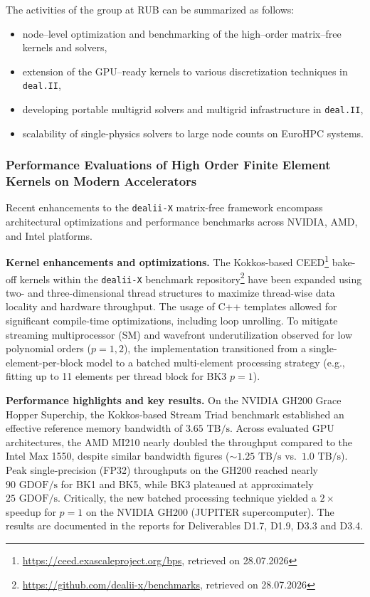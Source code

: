 \documentclass[a4paper,12pt, numbers]{article}
\newcommand{\dealii}{\texttt{deal.II}}
\begin{document}
The activities of the group at RUB can be summarized as follows:
\begin{itemize}
	\item node--level optimization and benchmarking of the high--order matrix--free kernels and solvers,
	\item extension of the GPU--ready kernels to various discretization techniques in \dealii,  
	\item developing portable multigrid solvers and multigrid infrastructure in \dealii,
	\item scalability of single-physics solvers to large node counts on EuroHPC systems.
\end{itemize}



\subsubsection*{Performance Evaluations of High Order Finite Element Kernels on Modern Accelerators}

\noindent Recent enhancements to the \texttt{dealii-X} matrix-free framework encompass architectural optimizations and performance benchmarks across NVIDIA, AMD, and Intel platforms.

\noindent\textbf{Kernel enhancements and optimizations.}
The Kokkos-based CEED\footnote{\url{https://ceed.exascaleproject.org/bps}, retrieved on 28.07.2026} bake-off kernels within the \texttt{dealii-X} benchmark repository\footnote{\url{https://github.com/dealii-x/benchmarks}, retrieved on 28.07.2026} have been expanded using two- and three-dimensional thread structures to maximize thread-wise data locality and hardware throughput. The usage of  C++ templates allowed for significant compile-time optimizations, including loop unrolling. To mitigate streaming multiprocessor (SM) and wavefront underutilization observed for low polynomial orders ($p=1, 2$), the implementation transitioned from a single-element-per-block model to a batched multi-element processing strategy (e.g., fitting up to 11 elements per thread block for BK3 $p=1$). 

\noindent\textbf{Performance highlights and key results.}
On the NVIDIA GH200 Grace Hopper Superchip, the Kokkos-based Stream Triad benchmark established an effective reference memory bandwidth of $3.65\text{ TB/s}$. Across evaluated GPU architectures, the AMD MI210 nearly doubled the throughput compared to the Intel Max 1550, despite similar bandwidth figures ($\sim 1.25\text{ TB/s}$ vs.\ $1.0\text{ TB/s}$). Peak single-precision (FP32) throughputs on the GH200 reached nearly $90\text{ GDOF/s}$ for BK1 and BK5, while BK3 plateaued at approximately $25\text{ GDOF/s}$. Critically, the new batched processing technique yielded a $2\times$ speedup for $p=1$ on the NVIDIA GH200 (JUPITER supercomputer). The results are documented in the reports for Deliverables D1.7, D1.9, D3.3 and D3.4.
\end{document}
